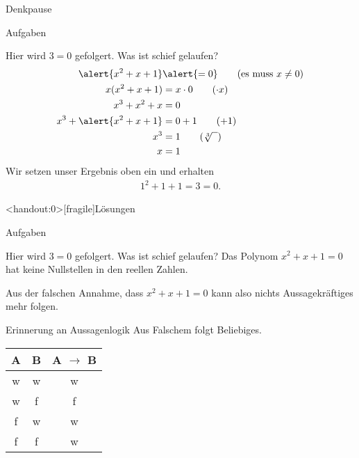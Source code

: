 
{
	\begin{frame}[fragile]{Denkpause}
		\begin{alertblock}{Aufgaben}
		\small{
			\begin{block}{Hier wird $3=0$ gefolgert. Was ist schief gelaufen?}
				\begin{align*}
					\alert{x^2 + x + 1} &\alert{= 0} \tag{es muss $x\neq0$}\\
					x(x^2 + x + 1) &= x \cdot 0 \tag{$\cdot x$}\\
					x^3 + x^2 + x &= 0\\
					x^3 + \alert{x^2 + x + 1} &= 0 + 1\tag{$+ 1$}\\
					x^3 &= 1\tag{$\sqrt[3]{\phantom{x}}$}\\
					x &= 1
				\end{align*}
				Wir setzen unser Ergebnis oben ein und erhalten
				\begin{align*}
					1^2 + 1 + 1= 3 = 0\text{.}
				\end{align*}
			\end{block}
		}
		\end{alertblock}
	\end{frame}
}

{
	\begin{frame}<handout:0>[fragile]{Lösungen}
		\begin{alertblock}{Aufgaben}
		\small{
			\begin{block}{Hier wird $3=0$ gefolgert. Was ist schief gelaufen?}
				Das Polynom $x^2 + x + 1 = 0$ hat keine Nullstellen in den reellen Zahlen.
				
				Aus der falschen Annahme, dass $x^2 + x + 1 = 0$ kann also nichts Aussagekräftiges mehr folgen.
			\end{block}
			\begin{alertblock}{Erinnerung an Aussagenlogik}
				Aus Falschem folgt Beliebiges.\\
				\begin{table}
					\begin{tabular}{ccc}
						\toprule
						A & B & A $\rightarrow$ B \\
						\midrule
						w & w & w \\
						w & f & f \\
						\alert{f} & \alert{w} & \alert{w} \\
						\alert{f} & \alert{f} & \alert{w} \\
						\bottomrule
					\end{tabular}
				\end{table}
			\end{alertblock}
		}
		\end{alertblock}
	\end{frame}
}